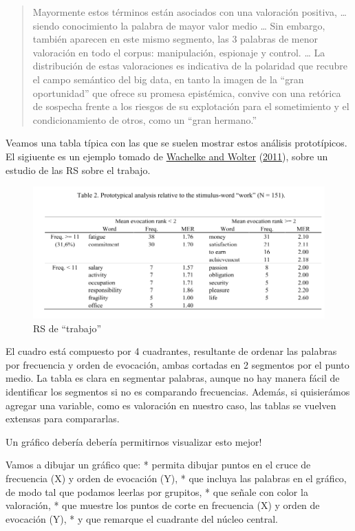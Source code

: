 \documentclass[
]{book}
\begin{document}
\begin{quote}
Mayormente estos términos están asociados con una valoración positiva, \ldots{} siendo conocimiento la palabra de mayor valor medio \ldots{} Sin embargo, también aparecen en este mismo segmento, las 3 palabras de menor valoración en todo el corpus: manipulación, espionaje y control. \ldots{} La distribución de estas valoraciones es indicativa de la polaridad que recubre el campo semántico del big data, en tanto la imagen de la ``gran oportunidad'' que ofrece su promesa epistémica, convive con una retórica de sospecha frente a los riesgos de su explotación para el sometimiento y el condicionamiento de otros, como un ``gran hermano.''
\end{quote}

Veamos una tabla típica con las que se suelen mostrar estos análisis prototípicos. El sigiuente es un ejemplo tomado de \protect\hyperlink{ref-Wachelke2011}{Wachelke and Wolter} (\protect\hyperlink{ref-Wachelke2011}{2011}), sobre un estudio de las RS sobre el trabajo.

\begin{figure}
\centering
\includegraphics{images/walcheque.png}
\caption{RS de ``trabajo''}
\end{figure}

El cuadro está compuesto por 4 cuadrantes, resultante de ordenar las palabras por frecuencia y orden de evocación, ambas cortadas en 2 segmentos por el punto medio. La tabla es clara en segmentar palabras, aunque no hay manera fácil de identificar los segmentos si no es comparando frecuencias. Además, si quisierámos agregar una variable, como es valoración en nuestro caso, las tablas se vuelven extensas para compararlas.

Un gráfico debería debería permitirnos visualizar esto mejor!

Vamos a dibujar un gráfico que:
* permita dibujar puntos en el cruce de frecuencia (X) y orden de evocación (Y),
* que incluya las palabras en el gráfico, de modo tal que podamos leerlas por grupitos,
* que señale con color la valoración,
* que muestre los puntos de corte en frecuencia (X) y orden de evocación (Y),
* y que remarque el cuadrante del núcleo central.
\end{document}
